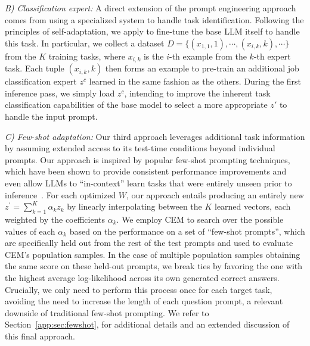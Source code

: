 \textit{B) Classification expert:} 
A direct extension of the prompt engineering approach comes from using a specialized system to handle task identification.
Following the principles of self-adaptation, we apply \svdacro to fine-tune the base LLM itself to handle this task.
In particular, we collect a dataset $D = \{(x_{1,1}, 1), \cdots, (x_{i,k}, k), \cdots \}$ from the $K$ \svdacro training tasks, where $x_{i,k}$ is the $i$-th example from the $k$-th expert task.
Each tuple $(x_{i,k}, k)$ then forms an example to pre-train an additional job classification expert $z^c$ learned in the same fashion as the others.
During the first inference pass, we simply load $z^c$, intending to improve the inherent task classification capabilities of the base model to select a more appropriate $z'$ to handle the input prompt. 

\textit{C) Few-shot adaptation:} Our third approach leverages additional task information by assuming extended access to its test-time conditions beyond individual prompts. 
Our approach is inspired by popular few-shot prompting techniques, which have been shown to provide consistent performance improvements and even allow LLMs to ``in-context'' learn tasks that were entirely unseen prior to inference~\citep{brown2020language}.
For each optimized $W$, our approach entails producing an entirely new $z^\prime=\sum^{K}_{k=1} \alpha_k z_k$ by linearly interpolating between the $K$ learned \svdacro vectors, each weighted by the coefficients $\alpha_k$.
We employ CEM to search over the possible values of each $\alpha_k$ based on the performance on a set of ``few-shot prompts'', which are specifically held out from the rest of the test prompts and used to evaluate CEM's population samples. 
In the case of multiple population samples obtaining the same score on these held-out prompts, we break ties by favoring the one with the highest average log-likelihood across its own generated correct answers.
Crucially, we only need to perform this process once for each target task, avoiding the need to increase the length of each question prompt, a relevant downside of traditional few-shot prompting. We refer to Section~\ref{app:sec:fewshot}, for additional details and an extended discussion of this final approach. 

\vspace{-2mm}